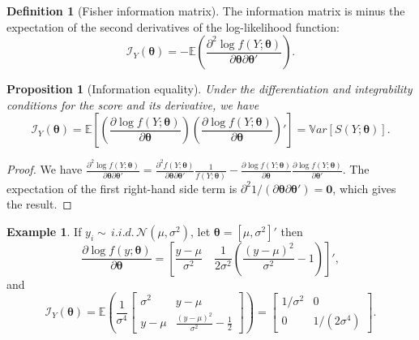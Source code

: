 \documentclass[
  11pt,
]{book}
\newtheorem{proposition}{Proposition}[chapter]
\theoremstyle{definition}
\newtheorem{definition}{Definition}[chapter]
\theoremstyle{definition}
\newtheorem{example}{Example}[chapter]
\theoremstyle{definition}
\theoremstyle{definition}
\theoremstyle{remark}
\begin{document}
\begin{definition}[Fisher information matrix]
\protect\hypertarget{def:Fisher}{}\label{def:Fisher}The information matrix is minus the expectation of the second derivatives of the log-likelihood function:
\[
\mathcal{I}_Y(\boldsymbol\theta) = - \mathbb{E} \left( \frac{\partial^2 \log f(Y;\boldsymbol\theta)}{\partial \boldsymbol\theta \partial \boldsymbol\theta'} \right).
\]
\end{definition}

\begin{proposition}[Information equality]
\protect\hypertarget{prp:information-equality}{}\label{prp:information-equality}Under the differentiation and integrability conditions for the score and its derivative, we have
\[
\mathcal{I}_Y(\boldsymbol\theta) = \mathbb{E} \left[ \left( \frac{\partial \log f(Y;\boldsymbol\theta)}{\partial \boldsymbol\theta} \right)
\left( \frac{\partial \log f(Y;\boldsymbol\theta)}{\partial \boldsymbol\theta} \right)' \right] = \mathbb{V}ar[S(Y;\boldsymbol\theta)].
\]
\end{proposition}

\begin{proof}
We have \(\frac{\partial^2 \log f(Y;\boldsymbol\theta)}{\partial \boldsymbol\theta \partial \boldsymbol\theta'} = \frac{\partial^2 f(Y;\boldsymbol\theta)}{\partial \boldsymbol\theta \partial \boldsymbol\theta'}\frac{1}{f(Y;\boldsymbol\theta)} - \frac{\partial \log f(Y;\boldsymbol\theta)}{\partial \boldsymbol\theta}\frac{\partial \log f(Y;\boldsymbol\theta)}{\partial \boldsymbol\theta'}\). The expectation of the first right-hand side term is \(\partial^2 1 /(\partial \boldsymbol\theta \partial \boldsymbol\theta') = \mathbf{0}\), which gives the result.
\end{proof}

\begin{example}
If \(y_i \sim\,i.i.d.\, \mathcal{N}(\mu,\sigma^2)\), let \(\boldsymbol\theta = [\mu,\sigma^2]'\) then
\[
\frac{\partial \log f(y;\boldsymbol\theta)}{\partial \boldsymbol\theta} = \left[\frac{y-\mu}{\sigma^2} \quad \frac{1}{2\sigma^2}\left(\frac{(y-\mu)^2}{\sigma^2}-1\right) \right]',
\]
and
\[
\mathcal{I}_Y(\boldsymbol\theta) = \mathbb{E}\left( \frac{1}{\sigma^4}
\left[
\begin{array}{cc}
\sigma^2&y-\mu\\
y-\mu & \frac{(y-\mu)^2}{\sigma^2}-\frac{1}{2}
\end{array}\right]
\right)=
\left[
\begin{array}{cc}
1/\sigma^2&0\\
0 & 1/(2\sigma^4)
\end{array}\right].
\]
\end{example}
\end{document}
